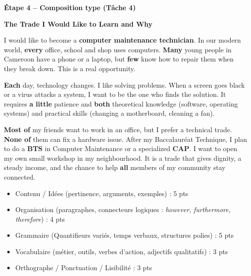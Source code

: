 \documentclass[11pt]{article}
\begin{document}
\textbf{Étape 4 -- Composition type (Tâche 4)}
\begin{exemplebox}
\textbf{The Trade I Would Like to Learn and Why}

I would like to become a \textbf{computer maintenance technician}. In our modern world, \textbf{every} office, school and shop uses computers. \textbf{Many} young people in Cameroon have a phone or a laptop, but \textbf{few} know how to repair them when they break down. This is a real opportunity.

\textbf{Each} day, technology changes. I like solving problems. When a screen goes black or a virus attacks a system, I want to be the one who finds the solution. It requires \textbf{a little} patience and \textbf{both} theoretical knowledge (software, operating systems) and practical skills (changing a motherboard, cleaning a fan).

\textbf{Most of} my friends want to work in an office, but I prefer a technical trade. \textbf{None of} them can fix a hardware issue. After my Baccalauréat Technique, I plan to do a \textbf{BTS} in Computer Maintenance or a specialized \textbf{CAP}. I want to open my own small workshop in my neighbourhood. It is a trade that gives dignity, a steady income, and the chance to help \textbf{all} members of my community stay connected.
\end{exemplebox}
\begin{aretenir}
\begin{itemize}
    \item Contenu / Idées (pertinence, arguments, exemples) : 5 pts
    \item Organisation (paragraphes, connecteurs logiques : \emph{however, furthermore, therefore}) : 4 pts
    \item Grammaire (Quantifieurs variés, temps verbaux, structures polies) : 5 pts
    \item Vocabulaire (métier, outils, verbes d'action, adjectifs qualitatifs) : 3 pts
    \item Orthographe / Ponctuation / Lisibilité : 3 pts
\end{itemize}
\end{aretenir}
\end{document}
